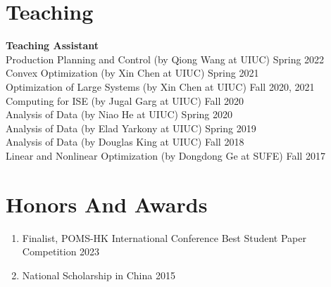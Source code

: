 \documentclass[margin,line]{resume}
\begin{document}
\begin{resume}
\begin{enumerate}[topsep=0pt, leftmargin=*]
 	          
 	           

 	  \end{enumerate}




\newpage
	  
 	  \section{\mysidestyle Teaching} 
         \textbf{Teaching Assistant}\\
         Production Planning and Control (by Qiong Wang at UIUC) \hfill Spring 2022\\
         Convex Optimization (by Xin Chen at UIUC) \hfill Spring 2021\\
         Optimization of Large Systems (by Xin Chen at UIUC) \hfill Fall 2020, 2021\\
         Computing for ISE (by Jugal Garg at UIUC) \hfill Fall 2020\\
         Analysis of Data (by Niao He at UIUC) \hfill Spring 2020\\
         Analysis of Data (by Elad Yarkony at UIUC) \hfill Spring 2019\\
        Analysis of Data (by Douglas King at UIUC) \hfill Fall 2018\\
        Linear and Nonlinear Optimization (by Dongdong Ge at SUFE) \hfill Fall 2017








         

 	  \section{\mysidestyle Honors And Awards} 
 	  \begin{enumerate}[topsep=0pt, leftmargin=*]
 	     \item Finalist, POMS-HK International Conference Best Student Paper Competition  \hfill 2023
 	     \item National Scholarship in China \hfill 2015\\
 	  \end{enumerate}


\end{resume}
\end{document}
